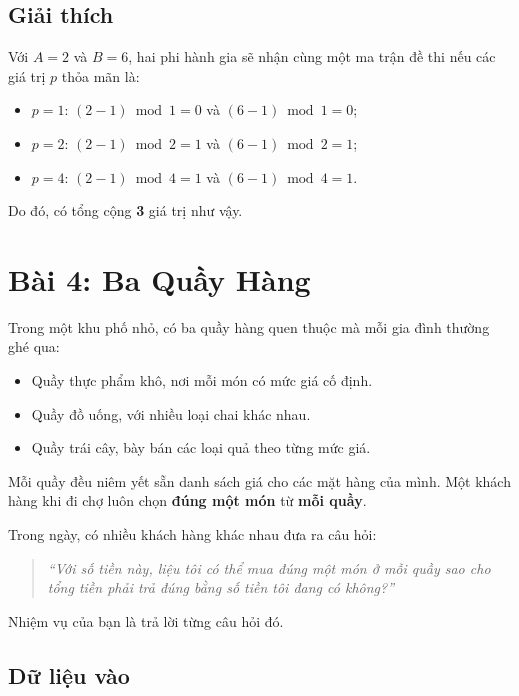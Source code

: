 \bigskip

\subsection*{Giải thích}

Với $A = 2$ và $B = 6$, hai phi hành gia sẽ nhận cùng một ma trận đề thi nếu các giá trị $p$ thỏa mãn là:
\begin{itemize}
    \item $p = 1$: $(2 - 1) \bmod 1 = 0$ và $(6 - 1) \bmod 1 = 0$;
    \item $p = 2$: $(2 - 1) \bmod 2 = 1$ và $(6 - 1) \bmod 2 = 1$;
    \item $p = 4$: $(2 - 1) \bmod 4 = 1$ và $(6 - 1) \bmod 4 = 1$.
\end{itemize}

Do đó, có tổng cộng \textbf{3} giá trị như vậy.

\bigskip

\section*{Bài 4: Ba Quầy Hàng}

Trong một khu phố nhỏ, có ba quầy hàng quen thuộc mà mỗi gia đình thường ghé qua:

\begin{itemize}
    \item Quầy thực phẩm khô, nơi mỗi món có mức giá cố định.
    \item Quầy đồ uống, với nhiều loại chai khác nhau.
    \item Quầy trái cây, bày bán các loại quả theo từng mức giá.
\end{itemize}

Mỗi quầy đều niêm yết sẵn danh sách giá cho các mặt hàng của mình.  
Một khách hàng khi đi chợ luôn chọn \textbf{đúng một món} từ \textbf{mỗi quầy}.

Trong ngày, có nhiều khách hàng khác nhau đưa ra câu hỏi:

\begin{quote}
    \emph{“Với số tiền này, liệu tôi có thể mua đúng một món ở mỗi quầy sao cho tổng tiền phải trả đúng bằng số tiền tôi đang có không?”}
\end{quote}

Nhiệm vụ của bạn là trả lời từng câu hỏi đó.

\subsection*{Dữ liệu vào}

